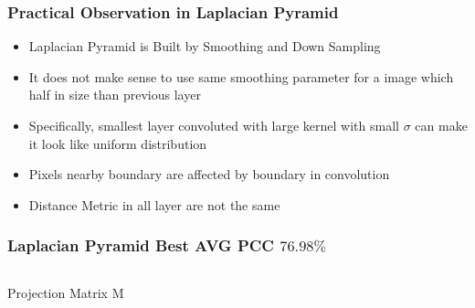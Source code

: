 \documentclass[11pt]{beamer}
\begin{document}
\begin{frame}
\frametitle{Practical Observation in Laplacian Pyramid}
\begin{itemize}
	\item Laplacian Pyramid is Built by Smoothing and Down Sampling
	\item It does not make sense to use same smoothing parameter for a image which half in size than previous layer
	\item Specifically, smallest layer convoluted with large kernel with small $\sigma$ can make it look like uniform distribution
	\item Pixels nearby boundary are affected by boundary in convolution
	\item Distance Metric in all layer are not the same
\end{itemize}

\begin{frame}
\frametitle{Laplacian Pyramid Best AVG PCC {$76.98\%$}}
\begin{columns}[T] %
\begin{column}{.8\textwidth}
\begin{table}
	\caption{Projection Matrix M}
\end{table}
\end{column}
\end{columns}
\end{frame}


\end{frame}
\end{document}
